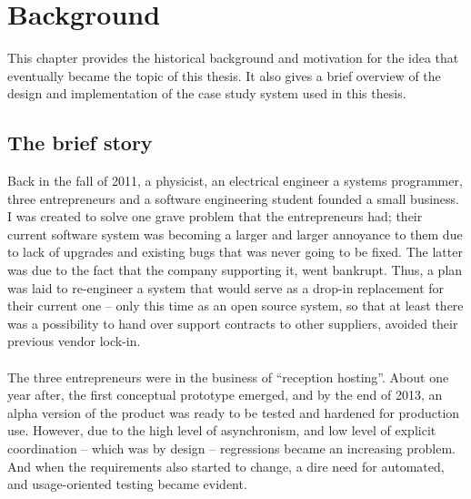 
\chapter{Background}
This chapter provides the historical background and motivation for the idea that eventually became the topic of this thesis. It also gives a brief overview of the design and implementation of the case study system used in this thesis.

\section{The brief story}
Back in the fall of 2011, a physicist, an electrical engineer a systems programmer, three entrepreneurs and a software engineering student founded a small business. I was created to solve one grave problem that the entrepreneurs had; their current software system was becoming a larger and larger annoyance to them due to lack of upgrades and existing bugs that was never going to be fixed. The latter was due to the fact that the company supporting it, went bankrupt. Thus, a plan was laid to re-engineer a system that would serve as a drop-in replacement for their current one -- only this time as an open source system, so that at least there was a possibility to hand over support contracts to other suppliers, avoided their previous vendor lock-in.\\\\
The three entrepreneurs were in the business of ``reception hosting''. About one year after, the first conceptual prototype emerged, and by the end of 2013, an alpha version of the product was ready to be tested and hardened for production use. However, due to the high level of asynchronism, and low level of explicit coordination -- which was by design -- regressions became an increasing problem. And when the requirements also started to change, a dire need for automated, and usage-oriented testing became evident.

